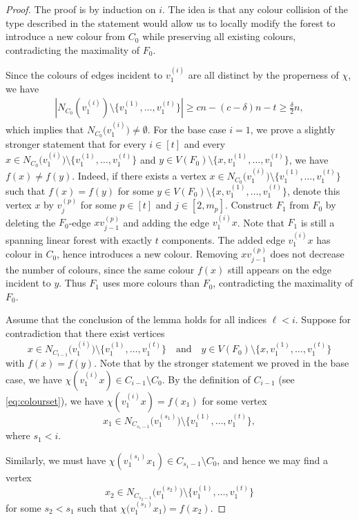 \documentclass[11pt,reqno]{amsart}
\theoremstyle{definition}
\theoremstyle{remark}
\renewcommand\ge{\geqslant}
\begin{document}
\begin{proof}
The proof is by induction on $i$.
The idea is that any colour collision of the type described in the
statement would allow us to locally modify the forest to introduce a new
colour from $C_0$ while preserving all existing colours, contradicting the
maximality of $F_0$.

Since the colours of edges incident to $v_1^{(i)}$ are all distinct by the properness of $\chi$, we have 
\begin{align*}
    |N_{C_0}(v_1^{(i)})\setminus \{v_1^{(1)},\ldots,v_1^{(t)}\}|\ge cn - (c-\delta)n -t \ge \frac{\delta }{2}n,
\end{align*}
which implies that $N_{C_{0}}\!\big(v_1^{(i)})\neq\emptyset$.
For the base case $i=1$, we prove a slightly stronger statement that for every $i\in[t]$ and every $x\in N_{C_{0}}\!\big(v_1^{(i)}\big)\setminus \{v_1^{(1)},\ldots,v_1^{(t)}\}$ and 
$y\in V(F_0)\setminus\{x,v_1^{(1)},\ldots,v_1^{(t)}\}$, we have $f(x)\neq f(y)$. Indeed, if there exists a vertex $x\in N_{C_{0}}\!\big(v_1^{(i)}\big)\setminus \{v_1^{(1)},\ldots,v_1^{(t)}\}$ such that $f(x)=f(y)$ for some $y\in V(F_0)\setminus\{x,v_1^{(1)},\ldots,v_1^{(t)}\}$, denote this vertex $x$ by $v_j^{(p)}$ for some $p\in[t]$ and $j\in[2,m_p]$.
Construct $F_1$ from $F_0$ by deleting the $F_0$-edge $xv_{j-1}^{(p)}$ and adding the edge
$v_1^{(i)}x$.
Note that $F_1$ is still a spanning linear forest with exactly $t$ components. The added edge $v_1^{(i)}x$ has colour in $C_0$, hence introduces a new colour.
Removing $xv_{j-1}^{(p)}$ does not decrease the number of colours, since the same
colour $f(x)$ still appears on the edge incident to $y$.
Thus $F_1$ uses more colours than $F_0$, contradicting the maximality of $F_0$.


Assume that the conclusion of the lemma holds for all indices $\ell<i$.
Suppose for contradiction that there exist vertices
\[
x\in N_{C_{i-1}}\!\big(v_1^{(i)}\big)\setminus\{v_1^{(1)},\ldots,v_1^{(t)}\}
\quad\text{and}\quad
y\in V(F_0)\setminus\{x,v_1^{(1)},\ldots,v_1^{(t)}\}
\]
with $f(x)=f(y)$. Note that by the stronger statement we proved in the base case, we have $\chi(v_1^{(i)}x)\in C_{i-1}\setminus C_0$. 
By the definition of $C_{i-1}$ (see \eqref{eq:colourset}), we have $\chi(v_1^{(i)}x)=f(x_1)$ for some vertex
\[
x_1\in N_{C_{s_1-1}}\!\big(v_1^{(s_1)}\big)\setminus \{v_1^{(1)},\ldots,v_1 ^{(t)}\},
\]
where $s_1<i$.

Similarly, we must have $\chi(v_1^{(s_1)}x_1)\in C_{s_1-1}\setminus C_0$, and hence we may find a vertex 
\[
x_2\in N_{C_{s_2-1}}\!\big(v_1^{(s_2)}\big)\setminus \{v_1^{(1)},\ldots,v_1 ^{(t)}\}
\]
for some $s_2<s_1$ such that $\chi\big(v_1^{(s_1)}x_1\big)=f(x_2).$


\end{proof}
\end{document}

